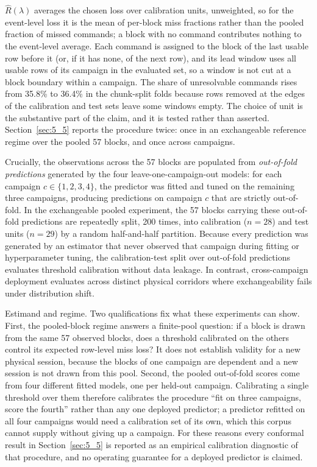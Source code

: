 $\hat{R}(\lambda)$ averages the chosen loss over calibration units, unweighted, so for the event-level loss it is the mean of per-block miss fractions rather than the pooled fraction of missed commands; a block with no command contributes nothing to the event-level average. Each command is assigned to the block of the last usable row before it (or, if it has none, of the next row), and its lead window uses all usable rows of its campaign in the evaluated set, so a window is not cut at a block boundary within a campaign. The share of unresolvable commands rises from 35.8\% to 36.4\% in the chunk-split folds because rows removed at the edges of the calibration and test sets leave some windows empty. The choice of unit is the substantive part of the claim, and it is tested rather than asserted. Section~\ref{sec:5_5} reports the procedure twice: once in an exchangeable reference regime over the pooled 57 blocks, and once across campaigns. 

Crucially, the observations across the 57 blocks are populated from \emph{out-of-fold predictions} generated by the four leave-one-campaign-out models: for each campaign $c \in \{1, 2, 3, 4\}$, the predictor was fitted and tuned on the remaining three campaigns, producing predictions on campaign $c$ that are strictly out-of-fold. In the exchangeable pooled experiment, the 57 blocks carrying these out-of-fold predictions are repeatedly split, 200 times, into calibration ($n = 28$) and test units ($n = 29$) by a random half-and-half partition. Because every prediction was generated by an estimator that never observed that campaign during fitting or hyperparameter tuning, the calibration-test split over out-of-fold predictions evaluates threshold calibration without data leakage. In contrast, cross-campaign deployment evaluates across distinct physical corridors where exchangeability fails under distribution shift.

Estimand and regime. Two qualifications fix what these experiments can show. First, the pooled-block regime answers a finite-pool question: if a block is drawn from the same 57 observed blocks, does a threshold calibrated on the others control its expected row-level miss loss? It does not establish validity for a new physical session, because the blocks of one campaign are dependent and a new session is not drawn from this pool. Second, the pooled out-of-fold scores come from four different fitted models, one per held-out campaign. Calibrating a single threshold over them therefore calibrates the procedure ``fit on three campaigns, score the fourth'' rather than any one deployed predictor; a predictor refitted on all four campaigns would need a calibration set of its own, which this corpus cannot supply without giving up a campaign. For these reasons every conformal result in Section~\ref{sec:5_5} is reported as an empirical calibration diagnostic of that procedure, and no operating guarantee for a deployed predictor is claimed.



